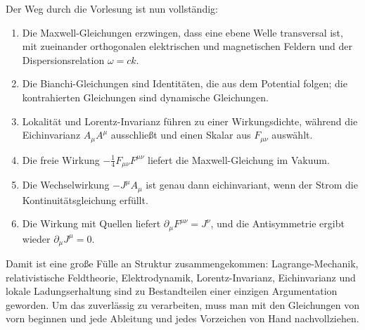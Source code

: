 Der Weg durch die Vorlesung ist nun vollständig:
\begin{enumerate}
\item Die Maxwell-Gleichungen erzwingen, dass eine ebene Welle transversal ist, mit zueinander orthogonalen elektrischen und magnetischen Feldern und der Dispersionsrelation
      \(\omega=ck\).
\item Die Bianchi-Gleichungen sind Identitäten, die aus dem Potential folgen; die kontrahierten Gleichungen sind dynamische Gleichungen.
\item Lokalität und Lorentz-Invarianz führen zu einer Wirkungsdichte, während die Eichinvarianz \(A_\mu A^\mu\) ausschließt und einen Skalar aus \(F_{\mu\nu}\) auswählt.
\item Die freie Wirkung
      \(-\tfrac14F_{\mu\nu}F^{\mu\nu}\) liefert die Maxwell-Gleichung im Vakuum.
\item Die Wechselwirkung \(-J^\mu A_\mu\) ist genau dann eichinvariant, wenn der Strom die Kontinuitätsgleichung erfüllt.
\item Die Wirkung mit Quellen liefert
      \(\partial_\mu F^{\mu\nu}=J^\nu\), und die Antisymmetrie ergibt wieder
      \(\partial_\mu J^\mu=0\).
\end{enumerate}

Damit ist eine große Fülle an Struktur zusammengekommen: Lagrange-Mechanik, relativistische Feldtheorie, Elektrodynamik, Lorentz-Invarianz, Eichinvarianz und lokale Ladungserhaltung sind zu Bestandteilen einer einzigen Argumentation geworden. Um das zuverlässig zu verarbeiten, muss man mit den Gleichungen von vorn beginnen und jede Ableitung und jedes Vorzeichen von Hand nachvollziehen.